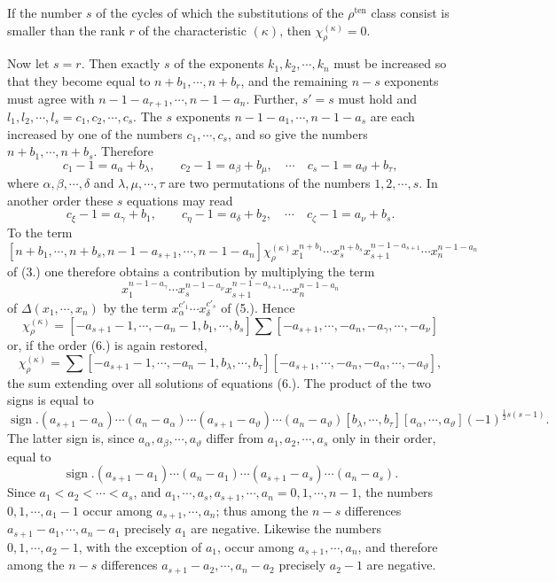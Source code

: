 \documentclass[11pt]{article}
\newcommand{\ten}{\mathrm{ten}}
\newcommand{\sign}{\operatorname{sign}}
\begin{document}
If the number $s$ of the cycles of which the substitutions of the $\rho^{\ten}$ class consist is smaller than the rank $r$ of the characteristic $(\kappa)$, then $\chi_\rho^{(\kappa)}=0$.

Now let $s=r$. Then exactly $s$ of the exponents $k_1,k_2,\cdots,k_n$ must be increased so that they become equal to $n+b_1,
\cdots,n+b_r$, and the remaining $n-s$ exponents must agree with $n-1-a_{r+1},\cdots,n-1-a_n$. Further, $s'=s$ must hold and $l_1,l_2,
\cdots,l_s=c_1,c_2,\cdots,c_s$. The $s$ exponents $n-1-a_1,
\cdots,n-1-a_s$ are each increased by one of the numbers $c_1,
\cdots,c_s$, and so give the numbers $n+b_1,
\cdots,n+b_s$. Therefore
\begin{equation}\tag{6.}
 c_1-1=a_\alpha+b_\lambda,
\qquad c_2-1=a_\beta+b_\mu,
\quad\cdots\quad c_s-1=a_\vartheta+b_\tau,
\end{equation}
where $\alpha,\beta,\cdots,
\delta$ and $\lambda,\mu,
\cdots,
\tau$ are two permutations of the numbers $1,2,\cdots,s$. In another order these $s$ equations may read
\[
 c_\xi-1=a_\gamma+b_1,
\qquad c_\eta-1=a_\delta+b_2,
\quad\cdots\quad c_\zeta-1=a_\nu+b_s.
\]
To the term
\[
 [n+b_1,
\cdots,n+b_s,n-1-a_{s+1},
\cdots,n-1-a_n]\chi_\rho^{(\kappa)}x_1^{n+b_1}\cdots x_s^{n+b_s}x_{s+1}^{n-1-a_{s+1}}\cdots x_n^{n-1-a_n}
\]
of (3.) one therefore obtains a contribution by multiplying the term
\[
 x_1^{n-1-a_\gamma}\cdots x_s^{n-1-a_\nu}x_{s+1}^{n-1-a_{s+1}}\cdots x_n^{n-1-a_n}
\]
of $\Delta(x_1,
\cdots,x_n)$ by the term $x_\alpha^{c'_1}\cdots x_\delta^{c'_s}$ of (5.). Hence
\[
 \chi_\rho^{(\kappa)}=[-a_{s+1}-1,
\cdots,-a_n-1,b_1,
\cdots,b_s]
 \sum[-a_{s+1},
\cdots,-a_n,-a_\gamma,
\cdots,-a_\nu]
\]
or, if the order (6.) is again restored,
\[
 \chi_\rho^{(\kappa)}=\sum[-a_{s+1}-1,
\cdots,-a_n-1,b_\lambda,
\cdots,b_\tau][-a_{s+1},
\cdots,-a_n,-a_\alpha,
\cdots,-a_\vartheta],
\]
the sum extending over all solutions of equations (6.). The product of the two signs is equal to
\[
 \sign.(a_{s+1}-a_\alpha)\cdots(a_n-a_\alpha)\cdots(a_{s+1}-a_\vartheta)\cdots(a_n-a_\vartheta)
 [b_\lambda,
\cdots,b_\tau][a_\alpha,
\cdots,a_\vartheta](-1)^{\frac12s(s-1)}.
\]
The latter sign is, since $a_\alpha,
a_\beta,
\cdots,
a_\vartheta$ differ from $a_1,a_2,
\cdots,a_s$ only in their order, equal to
\[
 \sign.(a_{s+1}-a_1)
\cdots(a_n-a_1)
\cdots(a_{s+1}-a_s)
\cdots(a_n-a_s).
\]
Since $a_1<a_2<\cdots<a_s$, and $a_1,
\cdots,a_s,a_{s+1},
\cdots,a_n=0,1,
\cdots,n-1$, the numbers $0,1,
\cdots,a_1-1$ occur among $a_{s+1},
\cdots,a_n$; thus among the $n-s$ differences $a_{s+1}-a_1,
\cdots,a_n-a_1$ precisely $a_1$ are negative. Likewise the numbers $0,1,
\cdots,a_2-1$, with the exception of $a_1$, occur among $a_{s+1},
\cdots,a_n$, and therefore among the $n-s$ differences $a_{s+1}-a_2,
\cdots,a_n-a_2$ precisely $a_2-1$ are negative.
\end{document}

